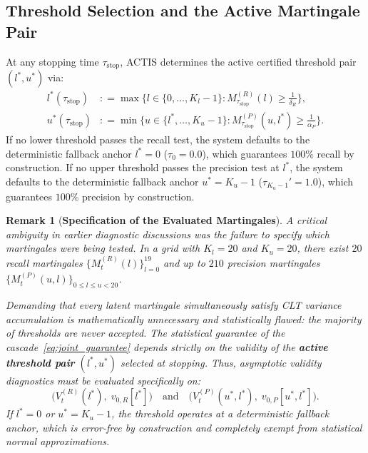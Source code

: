\documentclass[11pt,a4paper]{article}
\newcommand{\coloneqq}{\mathrel{\mathop:}=}
\newtheorem{remark}{Remark}
\begin{document}
\subsection{Threshold Selection and the Active Martingale Pair}
At any stopping time $\tau_{\text{stop}}$, ACTIS determines the active certified threshold pair $(l^*, u^*)$ via:
\begin{align}
l^*(\tau_{\text{stop}}) &\coloneqq \max \Big\{ l \in \{0, \dots, K_l-1\} : M_{\tau_{\text{stop}}}^{(R)}(l) \ge \frac{1}{\delta_R} \Big\}, \label{eq:select_l} \\
u^*(\tau_{\text{stop}}) &\coloneqq \min \Big\{ u \in \{l^*, \dots, K_u-1\} : M_{\tau_{\text{stop}}}^{(P)}(u, l^*) \ge \frac{1}{\alpha_P} \Big\}. \label{eq:select_u}
\end{align}
If no lower threshold passes the recall test, the system defaults to the deterministic fallback anchor $l^* = 0$ ($\tau_0 = 0.0$), which guarantees $100\%$ recall by construction. If no upper threshold passes the precision test at $l^*$, the system defaults to the deterministic fallback anchor $u^* = K_u - 1$ ($\tau_{K_u-1}' = 1.0$), which guarantees $100\%$ precision by construction.

\begin{remark}[\textbf{Specification of the Evaluated Martingales}]\label{rem:which_martingale}
A critical ambiguity in earlier diagnostic discussions was the failure to specify which martingales were being tested. In a grid with $K_l = 20$ and $K_u = 20$, there exist $20$ recall martingales $\{M_t^{(R)}(l)\}_{l=0}^{19}$ and up to $210$ precision martingales $\{M_t^{(P)}(u, l)\}_{0 \le l \le u < 20}$. 

Demanding that every latent martingale simultaneously satisfy CLT variance accumulation is mathematically unnecessary and statistically flawed: the majority of thresholds are never accepted. The statistical guarantee of the cascade~\eqref{eq:joint_guarantee} depends strictly on the validity of the \textbf{active threshold pair} $(l^*, u^*)$ selected at stopping. Thus, asymptotic validity diagnostics must be evaluated specifically on:
\begin{equation}
\big(V_t^{(R)}(l^*), \; v_{0, R}[l^*]\big) \quad \text{and} \quad \big(V_t^{(P)}(u^*, l^*), \; v_{0, P}[u^*, l^*]\big).
\end{equation}
If $l^* = 0$ or $u^* = K_u - 1$, the threshold operates at a deterministic fallback anchor, which is error-free by construction and completely exempt from statistical normal approximations.
\end{remark}
\end{document}
